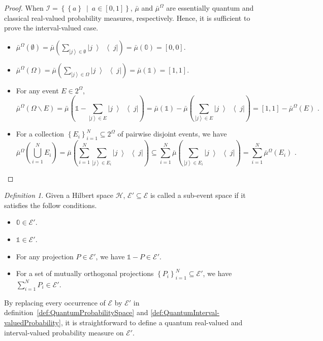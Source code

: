 \documentclass[12pt]{iopart}
\theoremstyle{remark}
\newtheorem{definition}{Definition}
\newcommand{\Hilb}{\mathcal{H}}
\newcommand{\events}{\ensuremath{\mathcal{E}}}
\newcommand{\ket}[1]{{\left\vert{#1}\right\rangle}}
\newcommand{\op}[2]{\ensuremath{\left\vert{#1}\middle\rangle\middle\langle{#2}\right\vert}}
\newcommand{\proj}[1]{\op{#1}{#1}}
\newcommand{\set}[2]{\ensuremath{\left\{ {#1}~\middle|~{#2}\right\} }}
\begin{document}
\begin{proof}When $\mathscr{I}=\set{\left\{ a\right\} }{a\in\left[0,1\right]}$,
$\bar{\mu}$ and $\bar{\mu}^{\Omega}$ are essentially quantum and
classical real-valued probability measures, respectively. Hence, it
is sufficient to prove the interval-valued case.
\begin{itemize}
\item $\bar{\mu}^{\Omega}(\emptyset)=\bar{\mu}\left(\sum_{\ket{j}\in\emptyset}\proj{j}\right)=\bar{\mu}\left(\mathbb{0}\right)=[0,0]$. 
\item $\bar{\mu}^{\Omega}(\Omega)=\bar{\mu}\left(\sum_{\ket{j}\in\Omega}\proj{j}\right)=\bar{\mu}\left(\mathbb{1}\right)=[1,1]$. 
\item For any event $E\in2^{\Omega}$,
\begin{equation}
\bar{\mu}^{\Omega}\left(\Omega\backslash E\right)=\bar{\mu}\left(\mathbb{1}-\sum_{\ket{j}\in E}\proj{j}\right)=\bar{\mu}\left(\mathbb{1}\right)-\bar{\mu}\left(\sum_{\ket{j}\in E}\proj{j}\right)=\left[1,1\right]-\bar{\mu}^{\Omega}\left(E\right)\textrm{ .}
\end{equation}
\item For a collection $\left\{ E_{i}\right\} _{i=1}^{N}\subseteq2^{\Omega}$
of pairwise disjoint events, we have
\begin{equation}
\bar{\mu}^{\Omega}\left(\bigcup_{i=1}^{N}E_{i}\right)=\bar{\mu}\left(\sum_{i=1}^{N}\sum_{\ket{j}\in E_{i}}\proj{j}\right)\subseteq\sum_{i=1}^{N}\bar{\mu}\left(\sum_{\ket{j}\in E_{i}}\proj{j}\right)=\sum_{i=1}^{N}\bar{\mu}^{\Omega}\left(E_{i}\right)\textrm{ .}
\end{equation}
\end{itemize}
\end{proof}

\begin{definition}Given a Hilbert space $\Hilb$, $\events'\subseteq\events$
is called a sub-event space if it satisfies the follow conditions.
\begin{itemize}
\item $\mathbb{0}\in\events'$.
\item $\mathbb{1}\in\events'$.
\item For any projection $P\in\events'$, we have $\mathbb{1}-P\in\events'$.
\item For a set of mutually orthogonal projections $\left\{ P_{i}\right\} _{i=1}^{N}\subseteq\events'$,
we have $\sum_{i=1}^{N}P_{i}\in\events'$.
\end{itemize}
By replacing every occurrence of $\events$ by $\events'$ in definition~\ref{def:QuantumProbabilitySpace}
and \ref{def:QuantumInterval-valuedProbability}, it is straightforward
to define a quantum real-valued and interval-valued probability measure
on $\events'$.\end{definition}
\end{document}
